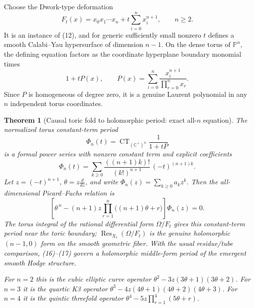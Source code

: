 \documentclass[11pt]{article}
\newtheorem{theorem}{Theorem}
\begin{document}
Choose the Dwork-type deformation
\[
 F_t(x)=x_0x_1\cdots x_n+
               t\sum_{i=0}^{n}x_i^{n+1},\qquad n\ge2.
\]
It is an instance of (12), and for generic sufficiently small nonzero
$t$ defines a smooth Calabi--Yau hypersurface of dimension $n-1$.
On the dense torus of $\mathbb P^n$, the defining equation factors
as the coordinate hyperplane boundary monomial times
\[
 1+tP(x),\qquad
 P(x)=\sum_{i=0}^n\frac{x_i^{n+1}}{\prod_{r=0}^n x_r}.
\]
Since $P$ is homogeneous of degree zero, it is a genuine Laurent
polynomial in any $n$ independent torus coordinates.

\begin{theorem}[Causal toric fold to holomorphic period: exact all-$n$ equation]
The normalized torus constant-term period
\[
 \Phi_n(t)=\operatorname{CT}_{(\mathbb C^\times)^n}
       \frac{1}{1+tP}
\]
is a formal power series with nonzero constant term and explicit
coefficients
\[
\boxed{\quad
\Phi_n(t)=\sum_{k\ge0}
 \frac{((n+1)k)!}{(k!)^{n+1}}\,(-t)^{(n+1)k}.
\quad} \tag{16}
\]
Let $z=(-t)^{n+1}$, $\theta=z\frac{d}{dz}$, and write
$\Phi_n(z)=\sum_{k\ge0}a_kz^k$.
Then the all-dimensional Picard--Fuchs relation is
\[
\boxed{\quad
\left[\theta^{\,n}
 -(n+1)z\prod_{r=1}^{n}\bigl((n+1)\theta+r\bigr)
 \right]\Phi_n(z)=0.
\quad} \tag{17}
\]
The torus integral of the rational differential form
$\Omega/F_t$ gives this constant-term period near the
toric boundary; $\operatorname{Res}_{X_t}(\Omega/F_t)$ is
the genuine holomorphic $(n-1,0)$ form on the smooth
geometric fiber. With the usual residue/tube comparison,
(16)--(17) govern a holomorphic middle-form period
of the emergent smooth Hodge structure.

For $n=2$ this is the cubic elliptic curve operator
$\theta^2-3z(3\theta+1)(3\theta+2)$.
For $n=3$ it is the quartic K3 operator
$\theta^3-4z(4\theta+1)(4\theta+2)(4\theta+3)$.
For $n=4$ it is the quintic threefold operator
$\theta^4-5z\prod_{r=1}^4(5\theta+r)$.
\end{theorem}
\end{document}
